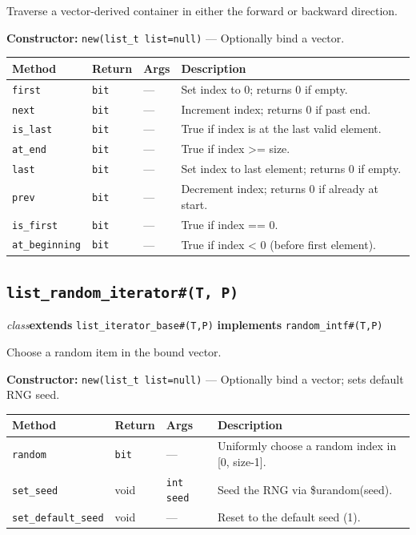 \documentclass[11pt,letterpaper]{report}
\begin{document}
Traverse a vector-derived container in either the forward or backward direction.

\noindent\textbf{Constructor:} \texttt{new(list\_t list=null)} --- Optionally bind a vector.

\begin{xltabular}{\linewidth}{>{\small}p{1.35in} >{\small}p{1.25in} >{\small}p{0.95in} >{\small}X}
\toprule
\textbf{Method} & \textbf{Return} & \textbf{Args} & \textbf{Description} \\
\midrule
\endhead
\bottomrule
\endfoot
\texttt{first} & \texttt{bit} & --- & Set index to 0; returns 0 if empty. \\
\texttt{next} & \texttt{bit} & --- & Increment index; returns 0 if past end. \\
\texttt{is\_last} & \texttt{bit} & --- & True if index is at the last valid element. \\
\texttt{at\_end} & \texttt{bit} & --- & True if index \textgreater{}= size. \\
\texttt{last} & \texttt{bit} & --- & Set index to last element; returns 0 if empty. \\
\texttt{prev} & \texttt{bit} & --- & Decrement index; returns 0 if already at start. \\
\texttt{is\_first} & \texttt{bit} & --- & True if index == 0. \\
\texttt{at\_beginning} & \texttt{bit} & --- & True if index \textless{} 0 (before first element). \\
\end{xltabular}

\subsection*{\texttt{list\_random\_iterator\#(T, P)}}
\noindent\small\textit{class}\quad \textbf{extends} \texttt{list\_iterator\_base\#(T,P)} \quad \textbf{implements} \texttt{random\_intf\#(T,P)}\par

Choose a random item in the bound vector.

\noindent\textbf{Constructor:} \texttt{new(list\_t list=null)} --- Optionally bind a vector; sets default RNG seed.

\begin{xltabular}{\linewidth}{>{\small}p{1.35in} >{\small}p{1.25in} >{\small}p{0.95in} >{\small}X}
\toprule
\textbf{Method} & \textbf{Return} & \textbf{Args} & \textbf{Description} \\
\midrule
\endhead
\bottomrule
\endfoot
\texttt{random} & \texttt{bit} & --- & Uniformly choose a random index in [0, size-1]. \\
\texttt{set\_seed} & void & \texttt{int seed} & Seed the RNG via \$urandom(seed). \\
\texttt{set\_default\_seed} & void & --- & Reset to the default seed (1). \\
\end{xltabular}
\end{document}
